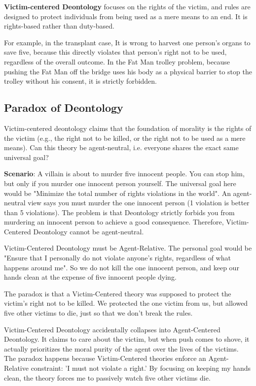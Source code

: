 \documentclass[12pt]{article}
\begin{document}
\noindent\textbf{Victim-centered Deontology} focuses on the rights of the victim, and rules are designed to protect individuals from being used as a mere means to an end.
It is rights-based rather than duty-based.

\noindent For example, in the transplant case, It is wrong to harvest one person's organs to save five, because this directly violates that person's right not to be used, regardless of the overall outcome.
In the Fat Man trolley problem, because pushing the Fat Man off the bridge uses his body as a physical barrier to stop the trolley without his consent, it is strictly forbidden.

\subsection{Paradox of Deontology}
Victim-centered deontology claims that the foundation of morality is the rights of the victim (e.g., the right not to be killed, or the right not to be used as a mere means).
Can this theory be agent-neutral, i.e. everyone shares the exact same universal goal?

\noindent\textbf{Scenario}: A villain is about to murder five innocent people. You can stop him, but only if you murder one innocent person yourself.
The universal goal here would be "Minimize the total number of rights violations in the world".
An agent-neutral view says you must murder the one innocent person (1 violation is better than 5 violations).
The problem is that Deontology strictly forbids you from murdering an innocent person to achieve a good consequence. Therefore, Victim-Centered Deontology cannot be agent-neutral.

\noindent Victim-Centered Deontology must be Agent-Relative.
The personal goal would be "Ensure that I personally do not violate anyone's rights, regardless of what happens around me".
So we do not kill the one innocent person, and keep our hands clean at the expense of five innocent people dying.

\noindent The paradox is that a Victim-Centered theory was supposed to protect the victim's right not to be killed.
We protected the one victim from us, but allowed five other victims to die, just so that we don't break the rules.

\noindent Victim-Centered Deontology accidentally collapses into Agent-Centered Deontology.
It claims to care about the victim, but when push comes to shove, it actually prioritizes the moral purity of the agent over the lives of the victims.
The paradox happens because Victim-Centered theories enforce an Agent-Relative constraint: 'I must not violate a right.'
By focusing on keeping my hands clean, the theory forces me to passively watch five other victims die.
\end{document}
